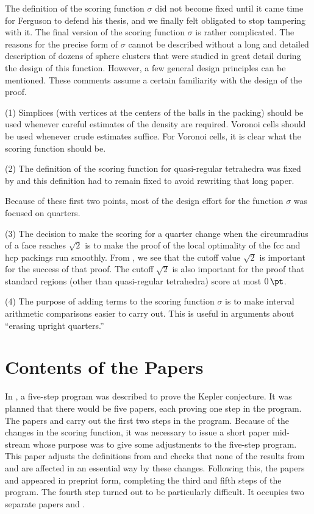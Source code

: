 The definition of the scoring function $\sigma$ did not become
fixed until it came time for Ferguson to defend his thesis, and we
finally felt obligated to stop tampering with it.  The final
version of the scoring function $\sigma$ is rather complicated.
The reasons for the precise form of $\sigma$ cannot be described
without a long and detailed description of dozens of sphere
clusters that were studied in great detail during the design of
this function. However, a few general design principles can be
mentioned.  These comments assume a certain familiarity with the
design of the proof.


(1) Simplices (with vertices at the centers of the balls in the
packing) should be used whenever careful estimates of the density
are required.  Voronoi cells should be used whenever crude
estimates suffice.  For Voronoi cells, it is clear what the
scoring function should be.



(2) The definition of the scoring function for quasi-regular
tetrahedra was fixed by \cite{part1} and this definition had to
remain fixed to avoid rewriting that long paper.

Because of these first two points, most of the design effort for
the function $\sigma$ was focused on quarters.

(3)  The decision to make the scoring for a quarter change when
the circumradius of a face reaches $\sqrt2$ is to make the proof
of the local optimality of the fcc and hcp packings run smoothly.
From \cite{part2}, we see that the cutoff value $\sqrt2$ is
important for the success of that proof.  The cutoff $\sqrt2$ is
also important for the proof that standard regions (other than
quasi-regular tetrahedra) score at most $0\,\pt$.

(4) The purpose of adding terms to the scoring function $\sigma$
is to make
interval arithmetic comparisons
easier to carry out.  This is useful in arguments about ``erasing
upright quarters.''

\section{Contents of the Papers}

In \cite{part1}, a five-step program was described to prove the
Kepler conjecture.  It was planned that there would be five
papers, each proving one step in the program.  The papers
\cite{part1} and \cite{part2} carry out the first two steps in the
program. Because of the changes in the scoring function, it was
necessary to issue a short paper \cite{Form} mid-stream whose
purpose was to give some adjustments to the five-step program.
This paper adjusts the definitions from \cite{part1} and checks
that none of the results from \cite{part1} and \cite{part2} are
affected in an essential way by these changes. Following this, the
papers \cite{Hal98B} and \cite{Fer97} appeared in preprint form,
completing the third and fifth steps of the program. The fourth
step turned out to be particularly difficult. It occupies two
separate papers \cite{Hal98C} and \cite{Hal98D}.

